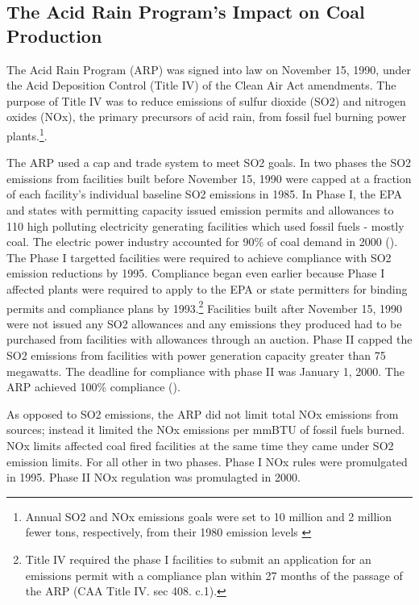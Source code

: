 \documentclass{article}
\begin{document}








\subsection{The Acid Rain Program's Impact on Coal Production}

The Acid Rain Program (ARP) was signed into law on November 15, 1990, under the Acid Deposition Control (Title IV) of the Clean Air Act amendments. The purpose of Title IV was to reduce emissions of sulfur dioxide (SO2) and nitrogen oxides (NOx), the primary precursors of acid rain, from fossil fuel burning power plants.\footnote{Annual SO2 and NOx emissions goals were set to 10 million and 2 million fewer tons, respectively, from their 1980 emission levels \cite{lattanzio2022clean}}. 

The ARP used a cap and trade system to meet SO2 goals. In two phases the SO2 emissions from facilities built before November 15, 1990 were capped at a fraction of each facility's individual baseline SO2 emissions in 1985. In Phase I, the EPA and states with permitting capacity issued emission permits and allowances to 110 high polluting electricity generating facilities which used fossil fuels - mostly coal. The electric power industry accounted for 90\% of coal demand in 2000 (\cite{freme2000us}). The Phase I targetted facilities were required to achieve compliance with SO2 emission reductions by 1995. Compliance began even earlier because Phase I affected plants were required to apply to the EPA or state permitters for binding permits and compliance plans by 1993.\footnote{Title IV required the phase I facilities to submit an application for an emissions permit with a compliance plan within 27 months of the passage of the ARP (CAA Title IV. sec 408. c.1).} Facilities built after November 15, 1990 were not issued any SO2 allowances and any emissions they produced had to be purchased from facilities with allowances through an auction. Phase II capped the SO2 emissions from facilities with power generation capacity greater than 75 megawatts. The deadline for compliance with phase II was January 1, 2000. The ARP achieved 100\% compliance (\cite{lattanzio2022clean}). 

As opposed to SO2 emissions, the ARP did not limit total NOx emissions from sources; instead it limited the NOx emissions per mmBTU of fossil fuels burned.
NOx limits affected coal fired facilities at the same time they came under SO2 emission limits. For all other in two phases. Phase I NOx rules were promulgated in 1995. Phase II NOx regulation was promulagted in 2000.
\end{document}
